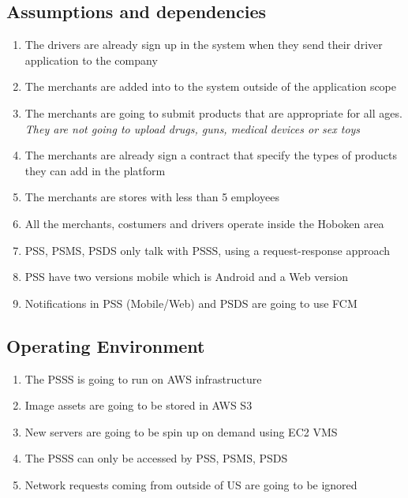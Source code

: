 \subsection{Assumptions and dependencies}
\begin{enumerate}[label=AS-\arabic*]
    \item The drivers are already sign up in the system when they send their 
    driver application to the company
    \item The merchants are added into to the system outside of the 
    application scope
    \item The merchants are going to submit products that are appropriate for 
    all ages. \textit{They are not going to upload drugs, guns, 
    medical devices or sex toys}
    \item The merchants are already sign a contract that specify the types of 
    products they can add in the platform
    \item The merchants are stores with less than 5 employees
    \item All the merchants, costumers and drivers operate inside the 
    Hoboken area
    \item PSS, PSMS, PSDS only talk with PSSS, using a 
    request-response approach
    \item PSS have two versions mobile which is Android and a Web version
    \item Notifications in PSS (Mobile/Web) and PSDS are going to use FCM
\end{enumerate}

\subsection{Operating Environment}
\begin{enumerate}[label=OE-\arabic*]
    \item The PSSS is going to run on AWS infrastructure
    \item Image assets are going to be stored in AWS S3
    \item New servers are going to be spin up on demand using EC2 VMS
    \item The PSSS can only be accessed by PSS, PSMS, PSDS 
    \item Network requests coming from outside of US are going to be ignored
\end{enumerate}